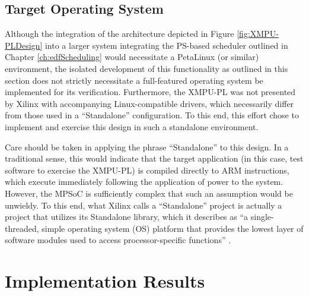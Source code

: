 \subsection{Target Operating System}\label{subsec:DMAEnvironmentOS}
Although the integration of the architecture depicted in Figure \ref{fig:XMPU-PLDesign} into a larger system integrating the PS-based scheduler outlined in Chapter \ref{ch:edfScheduling} would necessitate a PetaLinux (or similar) environment, the isolated development of this functionality as outlined in this section does not strictly necessitate a full-featured operating system be implemented for its verification. Furthermore, the XMPU-PL was not presented by Xilinx with accompanying Linux-compatible drivers, which necessarily differ from those used in a ``Standalone'' configuration. To this end, this effort chose to implement and exercise this design in such a standalone environment. 

Care should be taken in applying the phrase ``Standalone'' to this design. In a traditional sense, this would indicate that the target application (in this case, test software to exercise the XMPU-PL) is compiled directly to ARM instructions, which execute immediately following the application of power to the system. However, the MPSoC is sufficiently complex that such an assumption would be unwieldy. To this end, what Xilinx calls a ``Standalone'' project is actually a project that utilizes its Standalone library, which it describes as ``a single-threaded, simple operating system (OS) platform that provides the lowest layer of software modules used to access processor-specific functions'' \cite{noauthor_os_2020}.

\section{Implementation Results}\label{sec:DMAResults}

